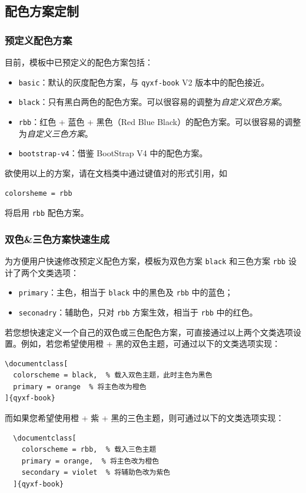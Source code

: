 \documentclass[
  10pt,
  twoside,
  openany,
  b5paper, %
  colorscheme = rbb, %
  xits = false,
]{qyxf-book}
\begin{document}
\subsection{配色方案定制}

\subsubsection{预定义配色方案}

目前，模板中已预定义的配色方案包括：
\begin{itemize}
  \item \verb|basic|：默认的灰度配色方案，与 \verb|qyxf-book| V2 版本中的配色接近。
  \item \verb|black|：只有黑白两色的配色方案。可以很容易的调整为\emph{自定义双色方案}。
  \item \verb|rbb|：红色 + 蓝色 + 黑色（Red Blue Black）的配色方案。可以很容易的调整为\emph{自定义三色方案}。
  \item \verb|bootstrap-v4|：借鉴 BootStrap V4 中的配色方案。
\end{itemize}
欲使用以上的方案，请在文档类中通过键值对的形式引用，如
\begin{tcolorbox}
\verb|colorsheme = rbb| 
\end{tcolorbox}
将启用 \verb|rbb| 配色方案。

\subsubsection{双色\&三色方案快速生成}
为方便用户快速修改预定义配色方案，模板为双色方案 \verb|black| 和三色方案 \verb|rbb| 设计了两个文类选项：
\begin{itemize}
  \item \verb|primary|：主色，相当于 \verb|black| 中的黑色及 \verb|rbb| 中的蓝色；
  \item \verb|seconadry|：辅助色，只对 \verb|rbb| 方案生效，相当于 \verb|rbb| 中的红色。
\end{itemize}
若您想快速定义一个自己的双色或三色配色方案，可直接通过以上两个文类选项设置。例如，若您希望使用橙 + 黑的双色主题，可通过以下的文类选项实现：
\begin{tcolorbox}
\begin{verbatim}
\documentclass[
  colorscheme = black,  % 载入双色主题，此时主色为黑色
  primary = orange  % 将主色改为橙色
]{qyxf-book}
\end{verbatim}
\end{tcolorbox}
而如果您希望使用橙 + 紫 + 黑的三色主题，则可通过以下的文类选项实现：
\begin{tcolorbox}
\begin{verbatim}
  \documentclass[
    colorscheme = rbb,  % 载入三色主题
    primary = orange,  % 将主色改为橙色
    secondary = violet  % 将辅助色改为紫色
  ]{qyxf-book}
\end{verbatim}
\end{tcolorbox}
\end{document}
